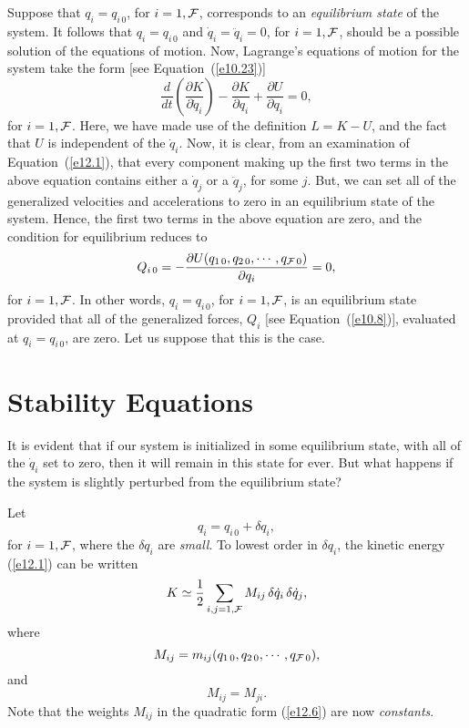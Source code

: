 Suppose that $q_i=q_{i\,0}$, for $i=1,{\cal F}$, corresponds to an
{\em equilibrium state} of the system. It follows that
$q_i=q_{i\,0}$ and $\dot{q}_i=\ddot{q}_i=0$, for $i=1,{\cal F}$, should be a possible solution of the equations of motion. 
Now, Lagrange's equations of motion for the system take the form [see
Equation~(\ref{e10.23})]
\begin{equation}\label{e12.3}
\frac{d}{dt}\!\left(\frac{\partial K}{\partial \dot{q}_i}\right) - \frac{\partial K}{\partial q_i}+ \frac{\partial U}{\partial q_i} = 0,
\end{equation}
for $i=1,{\cal F}$. Here, we have made use of the definition $L=K-U$, and
the fact that $U$ is independent of the $\dot{q}_i$.  Now, it is clear, from
an examination of Equation~(\ref{e12.1}), that every component making up
the first two terms in the above equation contains either a $\dot{q}_j$ or
a $\ddot{q}_j$, for some $j$.  But, we can set all of the generalized velocities
and accelerations  to zero in an equilibrium state of the system.
Hence, the first two terms in the above equation are zero, and the
condition for equilibrium reduces to
\begin{equation}\label{e12.2}
Q_{i\,0} = - \frac{\partial U(q_{1\,0}, q_{2\,0},\cdots,q_{{\cal F}\,0})}{\partial q_i} = 0,
\end{equation}
for $i=1,{\cal F}$. In other words,  $q_i=q_{i\,0}$, for $i=1,{\cal F}$, is an equilibrium
state provided that all of the generalized forces, $Q_i$ [see Equation~(\ref{e10.8})],  evaluated at $q_i=q_{i\,0}$,
are zero. Let us suppose that this is the case. 

\section{Stability Equations}
It is evident that if our system is initialized in some equilibrium state, with
all of the $\dot{q}_i$ set to zero, then it will remain in this state for ever. 
But what happens if the system is slightly perturbed from the equilibrium
state?

Let
\begin{equation}
q_i = q_{i\,0} + \delta q_i,
\end{equation}
for $i=1,{\cal F}$, where the $\delta q_i$ are {\em small}. To lowest order in $\delta q_i
$, the
kinetic energy (\ref{e12.1}) can be written
\begin{equation}\label{e12.6}
K \simeq \frac{1}{2}\sum_{i,j=1,{\cal F}} M_{ij}\,\delta\dot{q}_i\,\delta\dot{q}_j,
\end{equation}
where 
\begin{equation}\label{e12.7}
M_{ij} = m_{ij}(q_{1\,0},q_{2\,0},\cdots,q_{{\cal F}\,0}),
\end{equation}
and
\begin{equation}\label{e12.8}
M_{ij} = M_{ji}.
\end{equation}
Note that the weights $M_{ij}$ in the quadratic form (\ref{e12.6}) are now {\em constants}. 

